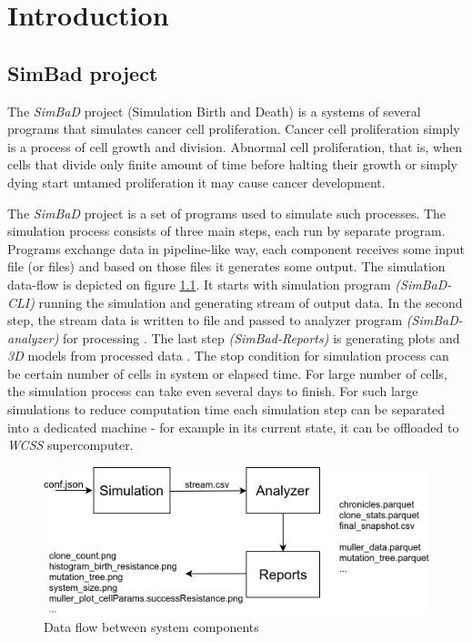 \chapter{Introduction}
\label{chapter:1}
\section{SimBad project}
The \textit{SimBaD} project (Simulation Birth and Death) is a systems of several programs that simulates cancer cell proliferation. Cancer cell proliferation simply is a process of cell growth and division. Abnormal cell proliferation, that is, when  cells that divide only finite amount of time before halting their growth or simply dying start untamed proliferation it may cause cancer development.

The \textit{SimBaD} project is a set of programs used to simulate such processes. The simulation process consists of three main steps, each run by separate program. Programs exchange data in pipeline-like way, each component receives some input file (or files) and based on those files it generates some output. The simulation data-flow is depicted on figure \ref{fig:data-flow}. It starts with simulation program \textit{(SimBaD-CLI)} \cite{TozanskiCLI} running the simulation and generating stream of output data. In the second step, the stream data is written to file and passed to analyzer program \textit{(SimBaD-analyzer)} for processing \cite{TozanskiAnalyzer}. The last step \textit{(SimBad-Reports)} is generating plots and \textit{3D} models from processed data \cite{TozanskiAnalyzer}.
The stop condition for simulation process can be certain number of cells in system or elapsed time. For large number of cells, the simulation process can take even several days to finish. For such large simulations to reduce computation time each simulation step can be separated into a dedicated machine - for example in its current state, it can be offloaded to \textit{WCSS} supercomputer. 
\begin{figure}[h!]
	\centering
		\includegraphics[width=0.9\linewidth]{diagrams/simbad-data-flow.png}
	\caption{Data flow between system components}
	\label{fig:data-flow}
\end{figure}
